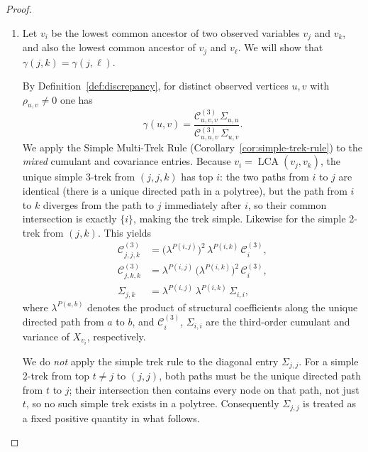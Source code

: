 \documentclass[11pt,a4paper]{article}
\numberwithin{equation}{section}
\begin{document}
\begin{proof}
\begin{enumerate}[label=(\arabic*)]
Under the \emph{generic parameters} assumption
(Definition~\ref{def:generic}),
equation~\eqref{eq:axiom1_key} cannot hold when $h\ne i$.
This forces $h = i$, i.e.\ $\operatorname{LCA}(i,j) = i$,
meaning $i$ is an ancestor of $j$.

  \item Let $v_i$ be the lowest common ancestor of two observed variables $v_j$
and $v_k$, and also the lowest common ancestor of $v_j$ and $v_\ell$.
We will show that $\gamma(j,k) = \gamma(j,\ell)$.

By Definition~\ref{def:discrepancy}, for distinct observed vertices $u,v$
with $\rho_{u,v}\neq 0$ one has
\[
  \gamma(u,v)
  = \frac{\mathcal{C}^{(3)}_{u,v,v}\,\Sigma_{u,u}}
         {\mathcal{C}^{(3)}_{u,u,v}\,\Sigma_{u,v}}.
\]
We apply the Simple Multi-Trek Rule (Corollary~\ref{cor:simple-trek-rule})
to the \emph{mixed} cumulant and covariance entries.  Because
$v_i = \operatorname{LCA}(v_j, v_k)$, the unique simple $3$-trek from
$(j,j,k)$ has top $i$: the two paths from $i$ to $j$ are identical (there
is a unique directed path in a polytree), but the path from $i$ to $k$
diverges from the path to $j$ immediately after $i$, so their common
intersection is exactly $\{i\}$, making the trek simple.  Likewise for
the simple 2-trek from $(j,k)$.  This yields
\begin{align*}
  \mathcal{C}^{(3)}_{j,j,k}
    &= \bigl(\lambda^{P(i,j)}\bigr)^2\,\lambda^{P(i,k)}\,\mathcal{C}^{(3)}_{i},
  \\
  \mathcal{C}^{(3)}_{j,k,k}
    &= \lambda^{P(i,j)}\,\bigl(\lambda^{P(i,k)}\bigr)^2\,\mathcal{C}^{(3)}_{i},
  \\
  \Sigma_{j,k}
    &= \lambda^{P(i,j)}\,\lambda^{P(i,k)}\,\Sigma_{i,i},
\end{align*}
where $\lambda^{P(a,b)}$ denotes the product of structural coefficients
along the unique directed path from $a$ to $b$, and
$\mathcal{C}^{(3)}_i$, $\Sigma_{i,i}$ are the third-order cumulant and
variance of $X_{v_i}$, respectively.

\begin{remark*}
We do \emph{not} apply the simple trek rule to the diagonal entry
$\Sigma_{j,j}$.  For a simple 2-trek from top $t\neq j$ to $(j,j)$, both
paths must be the unique directed path from $t$ to $j$; their intersection
then contains every node on that path, not just $t$, so no such simple trek
exists in a polytree.  Consequently $\Sigma_{j,j}$ is treated as a fixed
positive quantity in what follows.
\end{remark*}


\end{enumerate}
\end{proof}
\end{document}
